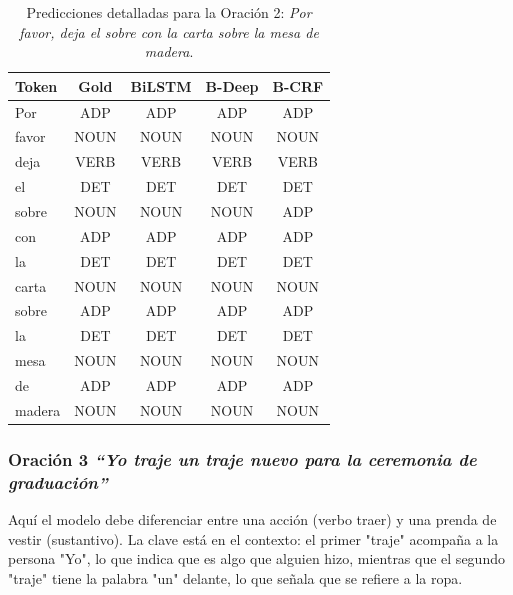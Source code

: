 \documentclass[12pt, a4paper]{article}
\begin{document}
\begin{table}[H]
    \centering
    \caption{Predicciones detalladas para la Oración 2: \textit{Por favor, deja el sobre con la carta sobre la mesa de madera}.}
    \label{tab:inf2_vert}
    \begin{tabular}{lcccc}
        \toprule
        \textbf{Token} & \textbf{Gold} & \textbf{BiLSTM} & \textbf{B-Deep} & \textbf{B-CRF} \\
        \midrule
        Por    & ADP  & ADP & ADP  & ADP \\
        favor  & NOUN & NOUN & NOUN & NOUN \\
        deja   & VERB & VERB & VERB & VERB\\
        el     & DET  & DET & DET  & DET \\
        sobre  & NOUN & NOUN & NOUN & ADP \\
        con    & ADP  & ADP & ADP  & ADP \\
        la     & DET  & DET & DET  & DET \\
        carta  & NOUN & NOUN & NOUN & NOUN \\
        sobre  & ADP  & ADP & ADP  & ADP \\
        la     & DET  & DET & DET  & DET \\
        mesa   & NOUN & NOUN & NOUN & NOUN \\
        de     & ADP  & ADP & ADP  & ADP \\
        madera & NOUN & NOUN & NOUN & NOUN \\
        \bottomrule
    \end{tabular}
\end{table}



\subsubsection{Oración 3 \textit{``Yo traje un traje nuevo para la ceremonia de graduación''}}

Aquí el modelo debe diferenciar entre una acción (verbo traer) y una prenda de vestir (sustantivo). La clave está en el contexto: el primer "traje" acompaña a la persona "Yo", lo que indica que es algo que alguien hizo, mientras que el segundo "traje" tiene la palabra "un" delante, lo que señala que se refiere a la ropa.
\end{document}

